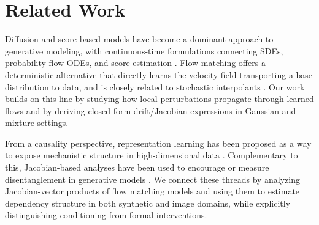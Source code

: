 \section{Related Work}
\label{sec:related_work}
Diffusion and score-based models have become a dominant approach to generative modeling, with continuous-time formulations connecting SDEs, probability flow ODEs, and score estimation \cite{ho2020denoising, song2021scorebased, song2020generative}. Flow matching offers a deterministic alternative that directly learns the velocity field transporting a base distribution to data, and is closely related to stochastic interpolants \cite{lipman2023flow, albergo2023building}. Our work builds on this line by studying how local perturbations propagate through learned flows and by deriving closed-form drift/Jacobian expressions in Gaussian and mixture settings.

From a causality perspective, representation learning has been proposed as a way to expose mechanistic structure in high-dimensional data \cite{scholkopf2021toward}. Complementary to this, Jacobian-based analyses have been used to encourage or measure disentanglement in generative models \cite{wei2021orthogonal, khrulkov2021disentangled}. We connect these threads by analyzing Jacobian-vector products of flow matching models and using them to estimate dependency structure in both synthetic and image domains, while explicitly distinguishing conditioning from formal interventions.
